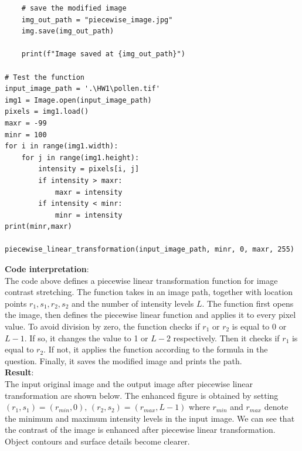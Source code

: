 \documentclass[UTF8]{ctexart}
\begin{document}
\begin{lstlisting}
    # save the modified image
    img_out_path = "piecewise_image.jpg"
    img.save(img_out_path)

    print(f"Image saved at {img_out_path}")
    
# Test the function
input_image_path = '.\HW1\pollen.tif'
img1 = Image.open(input_image_path)
pixels = img1.load()
maxr = -99
minr = 100
for i in range(img1.width):
    for j in range(img1.height):
        intensity = pixels[i, j]
        if intensity > maxr:
            maxr = intensity
        if intensity < minr:
            minr = intensity
print(minr,maxr)

piecewise_linear_transformation(input_image_path, minr, 0, maxr, 255)
\end{lstlisting}
\textbf{Code interpretation}:\\
The code above defines a piecewise linear transformation function for image contrast stretching. The function takes in an image path, together with location points $r_1, s_1, r_2, s_2$ and the number of intensity levels $L$.
The function first opens the image, then defines the piecewise linear function and applies it to every pixel value. To avoid division by zero, the function checks if $r_1$ or $r_2$ is equal to 0 or $L-1$. If so, it changes the value to 1 or $L-2$ respectively.
Then it checks if $r_1$ is equal to $r_2$. If not, it applies the function according to the formula in the question.
Finally, it saves the modified image and prints the path.\\
\textbf{Result}:\\
The input original image and the output image after piecewise linear transformation are shown below. The enhanced figure is obtained by setting $(r_1,s_1)=(r_{min},0),\, (r_2,s_2)=(r_{max},L-1)$
where $r_{min}$ and $r_{max}$ denote the minimum and maximum intensity levels in the input image.
We can see that the contrast of the image is enhanced after piecewise linear transformation. Object contours and surface details become clearer.
\end{document}

